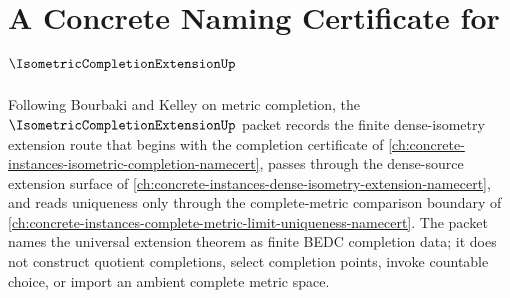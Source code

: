\chapter{A Concrete Naming Certificate for $\IsometricCompletionExtensionUp$}
\label{ch:concrete-instances-isometric-completion-extension-namecert}

Following Bourbaki and Kelley on metric completion, the $\IsometricCompletionExtensionUp$ packet records the finite dense-isometry extension route that begins with the completion certificate of \autoref{ch:concrete-instances-isometric-completion-namecert}, passes through the dense-source extension surface of \autoref{ch:concrete-instances-dense-isometry-extension-namecert}, and reads uniqueness only through the complete-metric comparison boundary of \autoref{ch:concrete-instances-complete-metric-limit-uniqueness-namecert}. The packet names the universal extension theorem as finite BEDC completion data; it does not construct quotient completions, select completion points, invoke countable choice, or import an ambient complete metric space.


